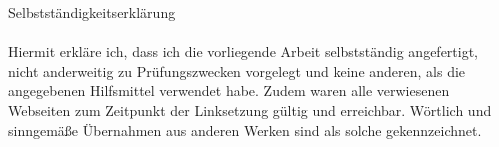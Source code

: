 \Large{Selbstständigkeitserklärung}\\
\\
\small Hiermit erkläre ich,
dass ich die vorliegende Arbeit selbstständig angefertigt,
nicht anderweitig zu Prüfungszwecken vorgelegt und keine anderen,
als die angegebenen Hilfsmittel verwendet habe.
Zudem waren alle verwiesenen Webseiten zum Zeitpunkt der Linksetzung gültig und erreichbar.
Wörtlich und sinngemäße Übernahmen aus anderen Werken sind als solche gekennzeichnet.
\\
\newpage

